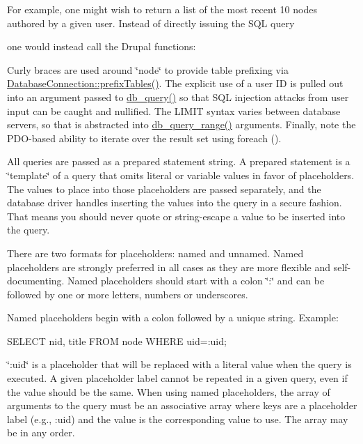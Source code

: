 For example, one might wish to return a list of the most recent 10 nodes authored by a given user. Instead of directly issuing the SQL query 
 one would instead call the Drupal functions: 
 Curly braces are used around \char`\"{}node\char`\"{} to provide table prefixing via \hyperlink{classDatabaseConnection_a10dfbe0177bc8c79a8589cc84afe24dd}{DatabaseConnection::prefixTables()}. The explicit use of a user ID is pulled out into an argument passed to \hyperlink{group__database_gafa3b6cb2b2f61479cc63a4150c62da9b}{db\_\-query()} so that SQL injection attacks from user input can be caught and nullified. The LIMIT syntax varies between database servers, so that is abstracted into \hyperlink{group__database_gadd8bfb4984a4c69ac741b2bb20d6b9bf}{db\_\-query\_\-range()} arguments. Finally, note the PDO-\/based ability to iterate over the result set using foreach ().

All queries are passed as a prepared statement string. A prepared statement is a \char`\"{}template\char`\"{} of a query that omits literal or variable values in favor of placeholders. The values to place into those placeholders are passed separately, and the database driver handles inserting the values into the query in a secure fashion. That means you should never quote or string-\/escape a value to be inserted into the query.

There are two formats for placeholders: named and unnamed. Named placeholders are strongly preferred in all cases as they are more flexible and self-\/documenting. Named placeholders should start with a colon \char`\"{}:\char`\"{} and can be followed by one or more letters, numbers or underscores.

Named placeholders begin with a colon followed by a unique string. Example: 
\begin{DoxyCode}
 SELECT nid, title FROM {node} WHERE uid=:uid;
\end{DoxyCode}


\char`\"{}:uid\char`\"{} is a placeholder that will be replaced with a literal value when the query is executed. A given placeholder label cannot be repeated in a given query, even if the value should be the same. When using named placeholders, the array of arguments to the query must be an associative array where keys are a placeholder label (e.g., :uid) and the value is the corresponding value to use. The array may be in any order.

